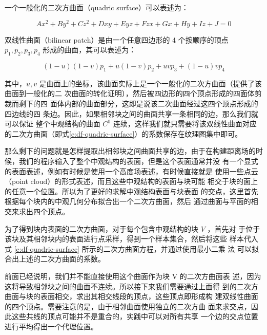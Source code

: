 一个一般化的二次方曲面（quadric surface）可以表述为：

\begin{equation}\label{e:df-quadric-surface}
	Ax^{2}+By^{2}+Cz^{2}+Dxy+Eyz+Fzx+Gx+Hy+Iz+J=0
\end{equation}


双线性曲面（bilinear patch）是由一个任意四边形的 4 个按顺序的顶点${p}_1, {p}_2, {p}_3, {p}_4$ 形成的曲面，其可以表述为：

\begin{equation}
	(1-u)(1-v){p}_1+u(1-v){p}_2+uv{p}_3+(1-u)v{p}_4
\end{equation}

\noindent 其中，$u, v$ 是曲面上的坐标，该曲面实际上是一个一般化的二次方曲面（\cite{a:Accurateandconsistentreconstructionofilluminationfunctionsusingstructuredsampling,a:Incrementalraycastingofpiecewisequadraticsurfacesonthegpu}提供了该曲面到一般化的二 次曲面的转化证明），然后被四边形的四个顶点形成的四面体剪裁而剩下的四 面体内部的曲面部分，这即是说该二次曲面经过这四个顶点形成的四边线的四 条边。因此，如果相邻块之间的曲面共享一条相同的边，那么我们就可以保证 整个中观结构的曲面 $C^{0}$ 连续，这样我们就只需要将该双线性曲面对应的二次方曲面（即式\ref{e:df-quadric-surface}）的系数保存在纹理图集中即可。 

那么剩下的问题就是怎样提取出相邻块之间曲面共享的边，由于在构建距离场的时候，我们的程序输入了整个中观结构的表面，但是这个表面通常并没 有一个显式的表面表述，例如有时候是使用一个高度场表述，有时候直接就是 使用一些点云（point cloud）的形式表述，而且这些中观结构的表面与块可能 相交于块的面上的任意一个位置。所以为了更好的求解中观结构表面与块表面 的交点，这里首先根据每个块内的中观几何分布拟合出一个二次方曲面，然后 通过曲面与平面的相交来求出四个顶点。

为了得到块内表面的二次方曲面，对于每个包含中观结构的块 $V$ ，首先对 于位于该块及其相邻块内的表面进行点采样，得到一个样本集合，然后将这些 样本代入式 \ref{e:df-quadric-surface} 所示的二次方曲面方程，并通过使用最小二乘 法 \cite{a:Geometricpropertyestimationfrom3drangedatapointsaidedbylocalquadricsurfacefitting} 可以拟合出上述的二次方曲面的系数。

前面已经说明，我们并不能直接使用这个曲面作为块 V 的二次方曲面表 述，因为这将导致相邻块之间的曲面不连续。所以接下来我们需要通过上面得 到的二次方曲面与块的表面相交，求出其相交线段的顶点，这些顶点即形成构 建双线性曲面的四个顶点。需要注意的是，由于相邻曲面使用独立的二次方曲 面来求交点，因此这些共线的顶点可能并不是重合的，实践中可以对所有共享 一个边的交点位置进行平均得出一个代理位置。

